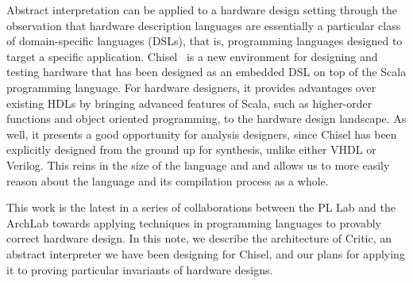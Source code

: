 \documentclass[10pt,conference]{IEEEtran}
\begin{document}
Abstract interpretation can be applied to a hardware design setting through
the observation that hardware description languages are essentially a particular
class of
domain-specific languages (DSLs), that is, programming languages designed to target
a specific application. Chisel~\cite{bachrach12} is a new environment for
designing and testing hardware that has been designed as an embedded DSL on top
of the Scala programming language. For hardware designers, it provides
advantages over existing HDLs by bringing advanced features of Scala, such
as higher-order functions and object oriented programming, to the hardware
design landscape. As well, it presents a good opportunity for analysis designers,
since Chisel has been explicitly designed from the ground up for synthesis, 
unlike either VHDL or Verilog. This reins in the size of the language and 
and allows us to more easily reason about the language and its compilation process
as a whole.

This work is the latest in a series of collaborations between the PL
Lab and the ArchLab towards applying techniques in programming languages to provably
correct hardware design. In this note, we describe the architecture of Critic, an abstract
interpreter we have been designing for Chisel, and our plans for applying it to proving
particular invariants of hardware designs.

%
%

\end{document}
